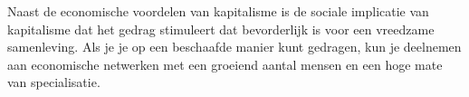 Naast de economische voordelen van kapitalisme is de sociale implicatie van kapitalisme dat het gedrag stimuleert dat bevorderlijk is voor een vreedzame samenleving. Als je je op een beschaafde manier kunt gedragen, kun je deelnemen aan economische netwerken met een groeiend aantal mensen en een hoge mate van specialisatie.
